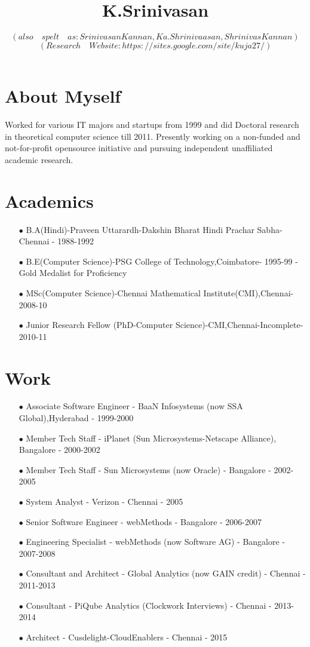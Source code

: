 \documentclass[11pt,onecolumn]{article}
\author{ $ (also \quad spelt \quad as: Srinivasan Kannan, Ka.Shrinivaasan, Shrinivas Kannan)$ \\
$ (Research \quad Website: https://sites.google.com/site/kuja27/) $ \\
}
\title{K.Srinivasan}
\date{}
\begin{document}
\thispagestyle{empty}
\pagestyle{empty}
\maketitle

\section{About Myself}
Worked for various IT majors and startups from 1999 and did Doctoral research in theoretical computer science till 2011. Presently working on a non-funded and not-for-profit opensource initiative and pursuing independent unaffiliated academic research.

\section{Academics}
\begin{enumerate}
\item[$\bullet$] B.A(Hindi)-Praveen Uttarardh-Dakshin Bharat Hindi Prachar Sabha-Chennai - 1988-1992
\item[$\bullet$] B.E(Computer Science)-PSG College of Technology,Coimbatore- 1995-99 - Gold Medalist for Proficiency
\item[$\bullet$] MSc(Computer Science)-Chennai Mathematical Institute(CMI),Chennai- 2008-10
\item[$\bullet$] Junior Research Fellow (PhD-Computer Science)-CMI,Chennai-Incomplete- 2010-11
\end{enumerate}

\section{Work}
\begin{enumerate}
\item[$\bullet$] Associate Software Engineer - BaaN Infosystems (now SSA Global),Hyderabad - 1999-2000
\item[$\bullet$] Member Tech Staff - iPlanet (Sun Microsystems-Netscape Alliance), Bangalore - 2000-2002
\item[$\bullet$] Member Tech Staff - Sun Microsystems (now Oracle) - Bangalore - 2002-2005
\item[$\bullet$] System Analyst - Verizon - Chennai - 2005
\item[$\bullet$] Senior Software Engineer - webMethods - Bangalore - 2006-2007
\item[$\bullet$] Engineering Specialist - webMethods (now Software AG) - Bangalore - 2007-2008
\item[$\bullet$] Consultant and Architect - Global Analytics (now GAIN credit) - Chennai - 2011-2013
\item[$\bullet$] Consultant - PiQube Analytics (Clockwork Interviews) - Chennai - 2013-2014
\item[$\bullet$] Architect - Cusdelight-CloudEnablers - Chennai - 2015
\end{enumerate}
\end{document}
